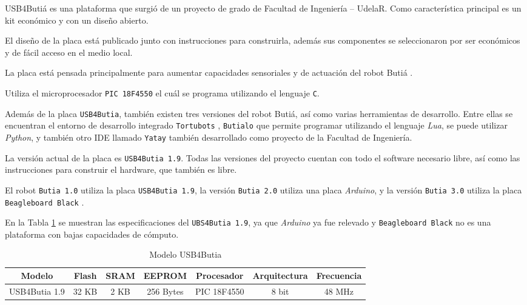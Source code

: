 
  USB4Butiá es una plataforma que surgió de un proyecto de grado de Facultad de
Ingeniería – UdelaR.
  Como característica principal es un kit económico y con un diseño abierto.

  El diseño de la placa está publicado junto con instrucciones para construirla,
además sus componentes se seleccionaron por ser económicos
y de fácil acceso en el medio local.

  La placa está pensada principalmente para aumentar capacidades sensoriales
  y de actuación del robot Butiá \cite{butia}.

  Utiliza el microprocesador \texttt{PIC 18F4550} \cite{pic18} el cuál se programa
  utilizando el lenguaje \texttt{C}.

  Además de la placa \texttt{USB4Butia}, también existen tres versiones
del robot Butiá, así como varias herramientas de desarrollo.
  Entre ellas se encuentran el entorno de desarrollo integrado \texttt{Tortubots} \cite{Tortubots},
  \texttt{Butialo} \cite{Butialo} que permite programar utilizando el lenguaje \textit{Lua},
  se puede utilizar \textit{Python}, y también otro IDE llamado \texttt{Yatay} \cite{yatay}
  también desarrollado como proyecto de la Facultad de Ingeniería.

  La versión actual de la placa es \texttt{USB4Butia 1.9}.
  Todas las versiones del proyecto cuentan con todo el software necesario libre, así
como las instrucciones para construir el hardware, que también es libre.

  El robot \texttt{Butia 1.0} utiliza la placa \texttt{USB4Butia 1.9},
la versión \texttt{Butia 2.0} utiliza una placa \textit{Arduino}, y
la versión \texttt{Butia 3.0} utiliza la placa \texttt{Beagleboard Black}
\cite{beagleboard}.

  En la Tabla \ref{table-usbbutia} se muestran las especificaciones del
\texttt{UBS4Butia 1.9}, ya que \textit{Arduino} ya fue relevado y
\texttt{Beagleboard Black} no es una plataforma con bajas capacidades
de cómputo.

\begin{table}[htbp]
\centering
\scriptsize
\setlength\tabcolsep{2pt}
\caption{Modelo USB4Butia}
\label{table-usbbutia}
\begin{tabular}{|c|c|c|c|c|c|c|}
  \hline
  Modelo & Flash & SRAM & EEPROM & Procesador & Arquitectura & Frecuencia \\
  \hline
  USB4Butia 1.9 & 32 KB & 2 KB & 256 Bytes & PIC 18F4550 & 8 bit & 48 MHz \\
  \hline
 \end{tabular}
\end{table}


